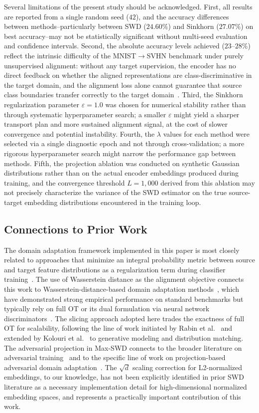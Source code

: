 \documentclass{article}
\begin{document}
	Several limitations of the present study should be acknowledged. First, all results are reported from a single random seed ($42$), and the accuracy differences between methods--particularly between SWD ($24.60\%$) and Sinkhorn ($27.07\%$) on best accuracy--may not be statistically significant without multi-seed evaluation and confidence intervals. Second, the absolute accuracy levels achieved ($23$--$28\%$) reflect the intrinsic difficulty of the MNIST$\to$SVHN benchmark under purely unsupervised alignment: without any target supervision, the encoder has no direct feedback on whether the aligned representations are class-discriminative in the target domain, and the alignment loss alone cannot guarantee that source class boundaries transfer correctly to the target domain~\cite{ben}. Third, the Sinkhorn regularization parameter $\varepsilon = 1.0$ was chosen for numerical stability rather than through systematic hyperparameter search; a smaller $\varepsilon$ might yield a sharper transport plan and more sustained alignment signal, at the cost of slower convergence and potential instability. Fourth, the $\lambda$ values for each method were selected via a single diagnostic epoch and not through cross-validation; a more rigorous hyperparameter search might narrow the performance gap between methods. Fifth, the projection ablation was conducted on synthetic Gaussian distributions rather than on the actual encoder embeddings produced during training, and the convergence threshold $L = 1{,}000$ derived from this ablation may not precisely characterize the variance of the SWD estimator on the true source-target embedding distributions encountered in the training loop.
	
	\subsection{Connections to Prior Work}
	
	The domain adaptation framework implemented in this paper is most closely related to approaches that minimize an integral probability metric between source and target feature distributions as a regularization term during classifier training~\citep{yaroslav}. The use of Wasserstein distance as the alignment objective connects this work to Wasserstein-distance-based domain adaptation methods~\citep{courty}, which have demonstrated strong empirical performance on standard benchmarks but typically rely on full OT or its dual formulation via neural network discriminators~\citep{martin}. The slicing approach adopted here trades the exactness of full OT for scalability, following the line of work initiated by Rabin et al.~\citep{rabin} and extended by Kolouri et al.~\cite{kolouri} to generative modeling and distribution matching. The adversarial projection in Max-SWD connects to the broader literature on adversarial training~\cite{goodfellow} and to the specific line of work on projection-based adversarial domain adaptation~\citep{ishan}. The $\sqrt{d}$ scaling correction for L2-normalized embeddings, to our knowledge, has not been explicitly identified in prior SWD literature as a necessary implementation detail for high-dimensional normalized embedding spaces, and represents a practically important contribution of this work.
	
\end{document}
